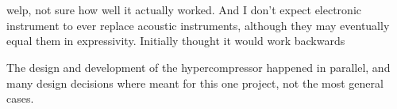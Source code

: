 \section{\thesis}
welp, not sure how well it actually
worked. And I don't expect electronic instrument to ever replace
acoustic instruments, although they may eventually equal them in
expressivity. Initially thought it would work backwards

The design and development of the hypercompressor happened in
parallel, and many design decisions where meant for this one project,
not the most general cases. 
